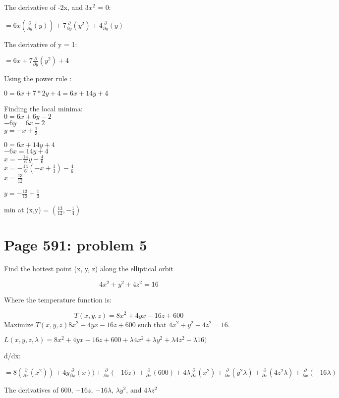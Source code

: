 \documentclass[]{article}
\begin{document}
The derivative of -2x, and \(3x^2\) = 0:

\(= 6x(\frac{\partial}{\partial y}(y)) + 7\frac{\partial}{\partial y}(y^2) + 4\frac{\partial}{\partial y}(y)\)

The derivative of y = 1:

\(= 6x + 7\frac{\partial}{\partial y}(y^2) + 4\)

Using the power rule :

\(0 = 6x + 7*2y + 4 = 6x + 14y + 4\)

Finding the local minima:\\
\(0 = 6x + 6y -2\)\\
\(-6y = 6x - 2\)\\
\(y = -x + \frac{1}{3}\)

\(0 = 6x + 14y + 4\)\\
\(-6x = 14y + 4\)\\
\(x = -\frac{14}{6}y - \frac{4}{6}\)\\
\(x = -\frac{14}{6}(-x + \frac{1}{3}) - \frac{4}{6}\)\\
\(x = \frac{13}{12}\)

\(y = - \frac{13}{12} + \frac{1}{3}\)

min at (x,y) = \((\frac{13}{12}, -\frac{1}{4})\)

\newpage

\section{Page 591: problem 5}\label{page-591-problem-5}

Find the hottest point (x, y, z) along the elliptical orbit

\[4x^2 +y^2 +4z^2 = 16\]

Where the temperature function is:

\[T(x,y,z) = 8x^2 + 4yx - 16z + 600\] Maximize
\(T(x,y,z) 8x^2 + 4yx - 16z + 600\) such that \(4x^2 +y^2 +4z^2 = 16\).

\(L(x,y,z,\lambda) = 8x^2 + 4yx - 16z + 600 + \lambda 4x^2 + \lambda y^2 +\lambda 4z^2 -\lambda 16)\)

d/dx:

\(= 8 (\frac{\partial}{\partial x}(x^2)) + 4y\frac{\partial}{\partial x}(x)) + \frac{\partial}{\partial x}(- 16z) + \frac{\partial}{\partial x}(600) + 4 \lambda \frac{\partial}{\partial x}(x^2) + \frac{\partial}{\partial x}(y^2\lambda) + \frac{\partial}{\partial x} (4z^2\lambda) + \frac{\partial}{\partial x} (-16 \lambda)\)

The derivatives of \(600\), \(-16z\), \(-16 \lambda\), \(\lambda y^2\),
and \(4 \lambda z^2\)
\end{document}
